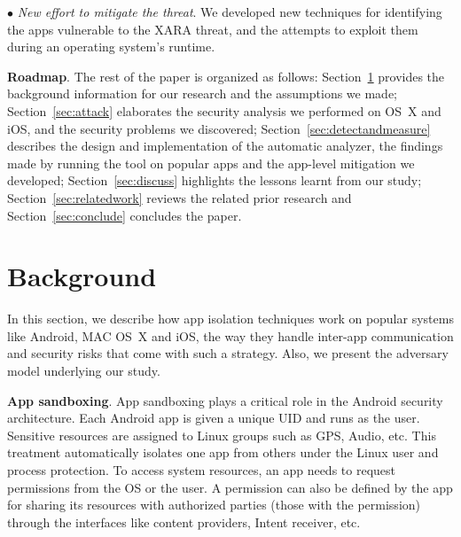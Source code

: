 \documentclass{article}
\newcommand{\ignore}[1]{}
\begin{document}
\vspace {2pt}\noindent$\bullet$\textit{ New effort to mitigate the threat}. We developed new techniques for identifying the apps vulnerable to the XARA threat, and the attempts to exploit them during an operating system's runtime. \ignore{We further discuss potential OS-level protection against this new type of security threat.}


\vspace {3pt}\noindent\textbf{Roadmap}.  The rest of the paper is organized as follows: Section~\ref{sec:background} provides the background information for our research and the assumptions we made; Section~\ref{sec:attack} elaborates the security analysis we performed on OS~X and iOS, and the security problems we discovered; Section~\ref{sec:detectandmeasure} describes the design and implementation of the automatic analyzer, the findings made by running the tool on popular apps and the app-level mitigation we developed; Section~\ref{sec:discuss} highlights the lessons learnt from our study; Section~\ref{sec:relatedwork} reviews the related prior research and Section~\ref{sec:conclude} concludes the paper.


\vspace {-8pt}
\section{Background}
\label{sec:background}


\ignore{As discussed earlier, modern OSes utilize various isolation techniques to separate apps from each other and limit the damage they may inflict on the system and other apps. }In this section, we describe how app isolation techniques work on popular systems like Android, MAC OS~X and iOS, the way they handle inter-app communication and security risks that come with such a strategy. Also, we present the adversary model underlying our study.

\vspace {3pt}\noindent\textbf{App sandboxing}. App sandboxing plays a critical role in the Android security architecture. Each Android app is given a unique UID and runs as the user. Sensitive resources are assigned to Linux groups such as GPS, Audio, etc. This treatment automatically isolates one app from others under the Linux user and process protection. To access system resources, an app needs to request permissions from the OS or the user.  A permission can also be defined by the app for sharing its resources with authorized parties (those with the permission) through the interfaces like content providers, Intent receiver, etc.
\end{document}

